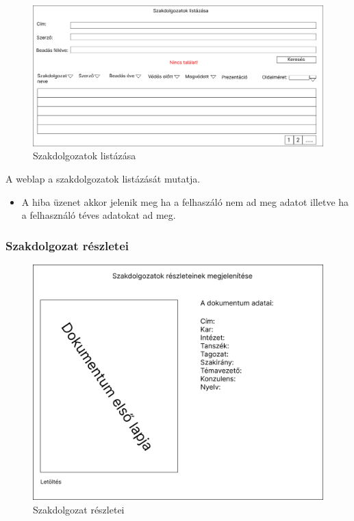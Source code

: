 \documentclass[a4paper,12pt]{article}
\begin{document}
\begin{figure}[h!]
	\centering
	\includegraphics[width=\textwidth]{images/Web_pages/Thesis_List.jpg}
	\caption{Szakdolgozatok listázása}
	\label{fig:Thesis_List}
\end{figure}

A weblap a szakdolgozatok listázását mutatja.
\begin{itemize}
	\item A hiba üzenet akkor jelenik meg ha a felhaszáló nem ad meg adatot illetve ha a felhasználó téves adatokat ad meg.
\end{itemize}

\subsubsection{Szakdolgozat részletei}

\begin{figure}[h!]
	\centering
	\includegraphics[scale=0.25]{images/Web_pages/Thesis_Details.jpg}
	\caption{Szakdolgozat részletei}
	\label{fig:Thesis_Details}
\end{figure}
\end{document}
